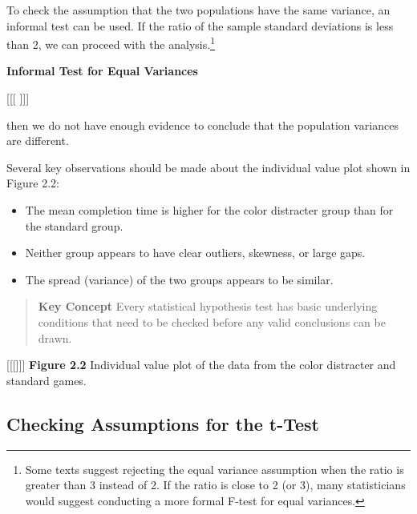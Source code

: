 \documentclass[
]{report}
\providecommand{\tightlist}{%
  \setlength{\itemsep}{0pt}\setlength{\parskip}{0pt}}
\begin{document}
To check the assumption that the two populations have the same variance, an informal test can be used. If the ratio of the sample standard deviations is less than 2, we can proceed with the analysis.\footnote{Some texts suggest rejecting the equal variance assumption when the ratio is greater than 3 instead of 2. If the ratio is close to 2 (or 3), many statisticians would suggest conducting a more formal F-test for equal variances.}

\textbf{Informal Test for Equal Variances}

{[}{[}{[} {]}{]}{]}

then we do not have enough evidence to conclude that the population variances are different.

Several key observations should be made about the individual value plot shown in Figure 2.2:

\begin{itemize}
\tightlist
\item
  The mean completion time is higher for the color distracter group than for the standard group.
\item
  Neither group appears to have clear outliers, skewness, or large gaps.
\item
  The spread (variance) of the two groups appears to be similar.
\end{itemize}

\begin{quote}
\textbf{Key Concept}
Every statistical hypothesis test has basic underlying conditions that need to be checked before any valid conclusions can be drawn.
\end{quote}

{[}{[}{[}{]}{]}{]}
\textbf{Figure 2.2} Individual value plot of the data from the color distracter and standard games.

\subsection*{Checking Assumptions for the t-Test}\label{checking-assumptions-for-the-t-test}
\end{document}
